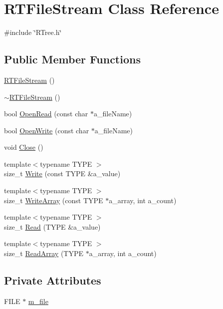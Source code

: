 \hypertarget{classRTFileStream}{\section{R\-T\-File\-Stream Class Reference}
\label{classRTFileStream}
}


{\ttfamily \#include \char`\"{}R\-Tree.\-h\char`\"{}}

\subsection*{Public Member Functions}
\begin{DoxyCompactItemize}
\item 
\hyperlink{classRTFileStream_a9fc06ec1548eead586a4d3e98ba43921}{R\-T\-File\-Stream} ()
\item 
\hyperlink{classRTFileStream_ad7666167a8f708f4f42cc27df446033b}{$\sim$\-R\-T\-File\-Stream} ()
\item 
bool \hyperlink{classRTFileStream_ac6173a0c9e27f20e6be7967973a4c88a}{Open\-Read} (const char $\ast$a\-\_\-file\-Name)
\item 
bool \hyperlink{classRTFileStream_a96b4770d34e8c5188d928ca5e53adb8b}{Open\-Write} (const char $\ast$a\-\_\-file\-Name)
\item 
void \hyperlink{classRTFileStream_acaae552bed709bfeb980b392ce5d7752}{Close} ()
\item 
{\footnotesize template$<$typename T\-Y\-P\-E $>$ }\\size\-\_\-t \hyperlink{classRTFileStream_a5f58ae8de73d979a992e4d7cfcbd462c}{Write} (const T\-Y\-P\-E \&a\-\_\-value)
\item 
{\footnotesize template$<$typename T\-Y\-P\-E $>$ }\\size\-\_\-t \hyperlink{classRTFileStream_a7f13b1aa9c3fd6c116c9d482bfc4ae0d}{Write\-Array} (const T\-Y\-P\-E $\ast$a\-\_\-array, int a\-\_\-count)
\item 
{\footnotesize template$<$typename T\-Y\-P\-E $>$ }\\size\-\_\-t \hyperlink{classRTFileStream_a389780f31ac4853b850fce1ce6ee9df9}{Read} (T\-Y\-P\-E \&a\-\_\-value)
\item 
{\footnotesize template$<$typename T\-Y\-P\-E $>$ }\\size\-\_\-t \hyperlink{classRTFileStream_afb034999c38e44e2a80637bfc3b907e5}{Read\-Array} (T\-Y\-P\-E $\ast$a\-\_\-array, int a\-\_\-count)
\end{DoxyCompactItemize}
\subsection*{Private Attributes}
\begin{DoxyCompactItemize}
\item 
F\-I\-L\-E $\ast$ \hyperlink{classRTFileStream_a835f8a26bae1528a3cfcbc13db62548d}{m\-\_\-file}
\end{DoxyCompactItemize}


